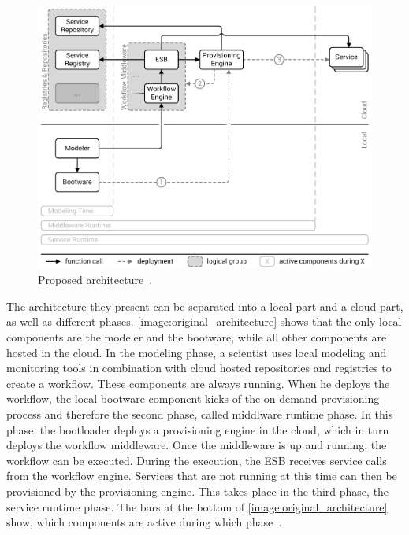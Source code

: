 \begin{figure}[!htbp]
	\centering
	\includegraphics[resolution=600]{previous/assets/original_architecture}
	\caption{Proposed architecture~\autocite[based on][]{provisioning:ondemand}.}
	\label{image:original_architecture}
\end{figure}

The architecture they present can be separated into a local part and a cloud part, as well as different phases.
\autoref{image:original_architecture} shows that the only local components are the modeler and the bootware, while all other components are hosted in the cloud.
In the modeling phase, a scientist uses local modeling and monitoring tools in combination with cloud hosted repositories and registries to create a workflow.
These components are always running.
When he deploys the workflow, the local bootware component kicks of the on demand provisioning process and therefore the second phase, called middlware runtime phase.
In this phase, the bootloader deploys a provisioning engine in the cloud, which in turn deploys the workflow middleware.
Once the middleware is up and running, the workflow can be executed. During the execution, the ESB receives service calls from the workflow engine.
Services that are not running at this time can then be provisioned by the provisioning engine.
This takes place in the third phase, the service runtime phase.
The bars at the bottom of \autoref{image:original_architecture} show, which components are active during which phase~\autocite{provisioning:ondemand}.
